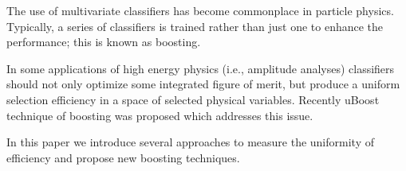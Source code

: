 The use of multivariate classifiers has become commonplace in particle physics. 
Typically, a series of classifiers is trained rather than just one to enhance the performance; this is known as boosting. 

In some applications of high energy physics (i.e., amplitude analyses) 
classifiers should not only optimize some integrated figure of merit, but produce a uniform selection efficiency in a space of selected physical variables.
Recently uBoost technique of boosting was proposed which addresses this issue.

In this paper we introduce several approaches to measure the uniformity of efficiency and propose new boosting techniques.
